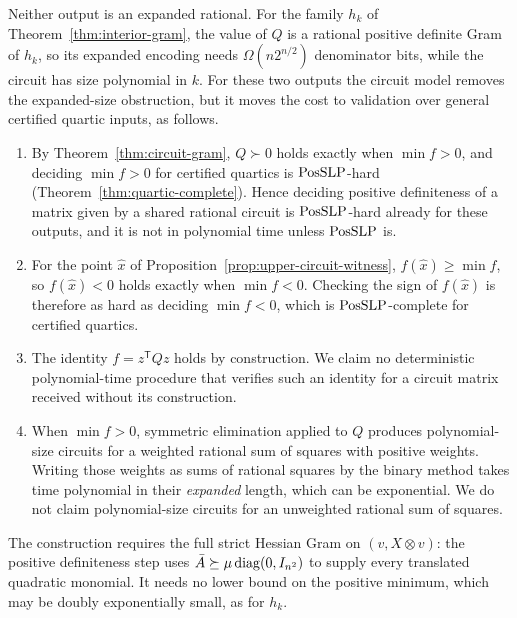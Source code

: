 Neither output is an expanded rational. For the family $h_k$ of
Theorem~\ref{thm:interior-gram}, the value of $Q$ is a rational positive
definite Gram of $h_k$, so its expanded encoding needs $\Omega(n2^{n/2})$
denominator bits, while the circuit has size polynomial in $k$. For these two
outputs the circuit model removes the expanded-size obstruction, but it moves
the cost to validation over general certified quartic inputs, as follows.
\begin{enumerate}[label=(\roman*)]
\item By Theorem~\ref{thm:circuit-gram}, $Q\succ0$ holds exactly when
  $\min f>0$, and deciding $\min f>0$ for certified quartics is
  $\mathrm{PosSLP}$-hard (Theorem~\ref{thm:quartic-complete}). Hence deciding
  positive definiteness of a matrix given by a shared rational circuit is
  $\mathrm{PosSLP}$-hard already for these outputs, and it is not in polynomial time
  unless $\mathrm{PosSLP}$ is.
\item For the point $\hat x$ of Proposition~\ref{prop:upper-circuit-witness},
  $f(\hat x)\ge\min f$, so $f(\hat x)<0$ holds exactly when $\min f<0$.
  Checking the sign of $f(\hat x)$ is therefore as hard as deciding
  $\min f<0$, which is $\mathrm{PosSLP}$-complete for certified quartics.
\item The identity $f=z^{\mathsf T}Qz$ holds by construction. We claim no
  deterministic polynomial-time procedure that verifies such an identity for
  a circuit matrix received without its construction.
\item When $\min f>0$, symmetric elimination applied to $Q$ produces
  polynomial-size circuits for a weighted rational sum of squares with
  positive weights. Writing those weights as sums of rational squares by the
  binary method takes time polynomial in their \emph{expanded} length, which
  can be exponential. We do not claim polynomial-size circuits for an
  unweighted rational sum of squares.
\end{enumerate}
The construction requires the full strict Hessian Gram on $(v,X\otimes v)$:
the positive definiteness step uses $\bar A\succeq\mu\operatorname{diag}(0,I_{n^2})$ to
supply every translated quadratic monomial. It needs no lower bound on the
positive minimum, which may be doubly exponentially small, as for $h_k$.

